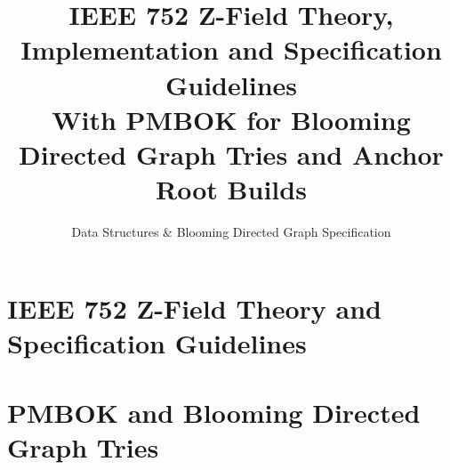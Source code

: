 \documentclass[11pt,a4paper]{book}
\title{IEEE 752 Z-Field Theory, Implementation and Specification Guidelines\\[0.5em]
\large With PMBOK for Blooming Directed Graph Tries and Anchor Root Builds}
\author{Data Structures \& Blooming Directed Graph Specification}
\date{}
\begin{document}
\maketitle
\tableofcontents

\part{IEEE 752 Z-Field Theory and Specification Guidelines}



\part{PMBOK and Blooming Directed Graph Tries}



\end{document}
